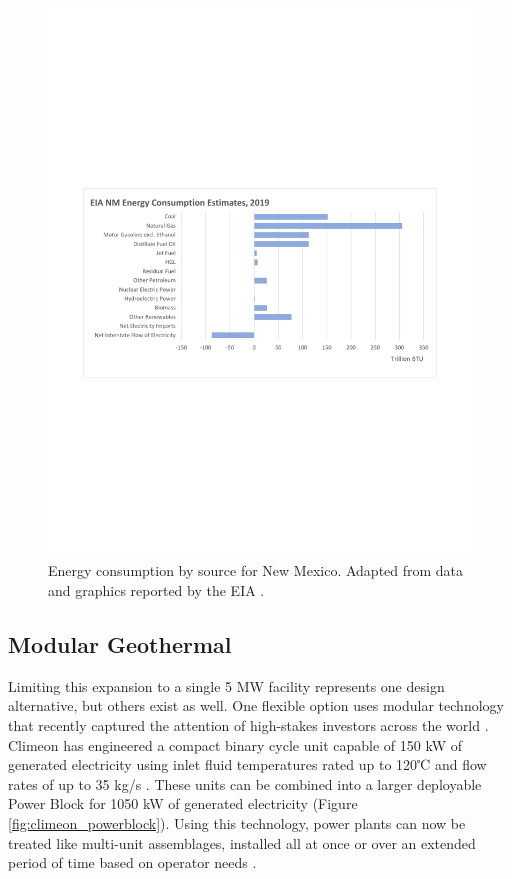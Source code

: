 \begin{figure}[!htp]
\centering
\includegraphics[width=\textwidth]{templates/images/Figure-EIA_NM_Energy_Consumption.pdf}
\caption[NM energy consumption]{Energy consumption by source for New Mexico. Adapted from data and graphics reported by the EIA \protect\citep{eia_new_2021}.}
\label{fig:nm_energy_consumption}
\end{figure}

\subsection{Modular Geothermal}\label{ch4:modular_geothermal}
Limiting this expansion to a single 5 MW facility represents one design alternative, but others exist as well. One flexible option uses modular technology that recently captured the attention of high-stakes investors across the world \citep{shieber_bill_2019}. Climeon has engineered a compact binary cycle unit capable of 150 kW of generated electricity using inlet fluid temperatures rated up to 120℃ and flow rates of up to 35 kg/s \citep{climeon_climeon_2021-1}. These units can be combined into a larger deployable Power Block for 1050 kW of generated electricity \citep{winther_power_2018} (Figure \ref{fig:climeon_powerblock}). Using this technology, power plants can now be treated like multi-unit assemblages, installed all at once or over an extended period of time based on operator needs \citep{climeon_why_2018}.

